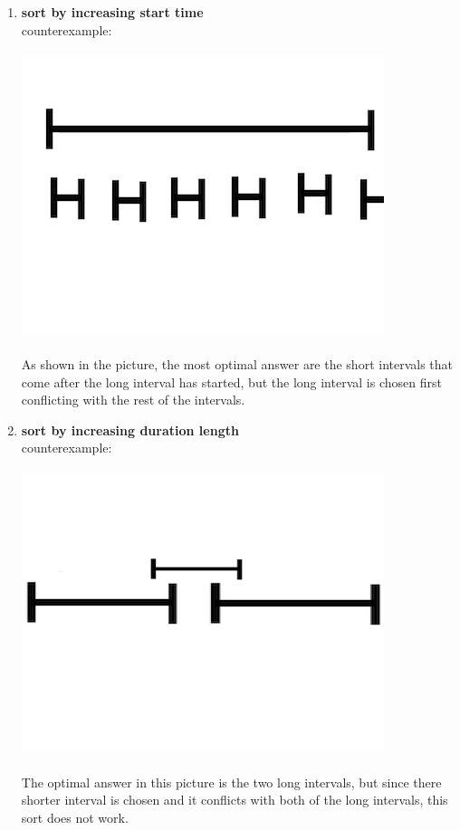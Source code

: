 \documentclass[12pt]{article}
\begin{document}
\begin{enumerate}
	\item{
	\textbf{sort by increasing start time}\\
	counterexample:\\
	\\
	\includegraphics{interval2}\\
	\\
	As shown in the picture, the most optimal answer are the short intervals that come after the long interval has started, but the long interval is chosen first conflicting with the rest of the intervals.
	}
	\item{
	\textbf{sort by increasing duration length}\\
	counterexample:\\
	\\
	\includegraphics{interval3}\\
	\\
	The optimal answer in this picture is the two long intervals, but since there shorter interval is chosen and it conflicts with both of the long intervals, this sort does not work.
}
\end{enumerate}
\end{document}
